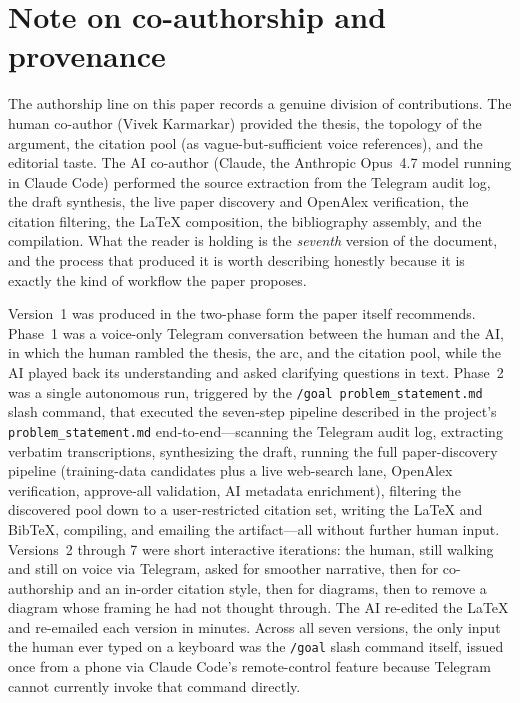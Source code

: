 \documentclass[11pt]{article}
\begin{document}
\section*{Note on co-authorship and provenance}

The authorship line on this paper records a genuine division of contributions. The human co-author (Vivek Karmarkar) provided the thesis, the topology of the argument, the citation pool (as vague-but-sufficient voice references), and the editorial taste. The AI co-author (Claude, the Anthropic Opus~4.7 model running in Claude Code) performed the source extraction from the Telegram audit log, the draft synthesis, the live paper discovery and OpenAlex verification, the citation filtering, the \LaTeX{} composition, the bibliography assembly, and the compilation. What the reader is holding is the \emph{seventh} version of the document, and the process that produced it is worth describing honestly because it is exactly the kind of workflow the paper proposes.

Version~1 was produced in the two-phase form the paper itself recommends. Phase~1 was a voice-only Telegram conversation between the human and the AI, in which the human rambled the thesis, the arc, and the citation pool, while the AI played back its understanding and asked clarifying questions in text. Phase~2 was a single autonomous run, triggered by the \texttt{/goal problem\_statement.md} slash command, that executed the seven-step pipeline described in the project's \texttt{problem\_statement.md} end-to-end---scanning the Telegram audit log, extracting verbatim transcriptions, synthesizing the draft, running the full paper-discovery pipeline (training-data candidates plus a live web-search lane, OpenAlex verification, approve-all validation, AI metadata enrichment), filtering the discovered pool down to a user-restricted citation set, writing the \LaTeX{} and BibTeX, compiling, and emailing the artifact---all without further human input. Versions~2 through 7 were short interactive iterations: the human, still walking and still on voice via Telegram, asked for smoother narrative, then for co-authorship and an in-order citation style, then for diagrams, then to remove a diagram whose framing he had not thought through. The AI re-edited the \LaTeX{} and re-emailed each version in minutes. Across all seven versions, the only input the human ever typed on a keyboard was the \texttt{/goal} slash command itself, issued once from a phone via Claude Code's remote-control feature because Telegram cannot currently invoke that command directly.
\end{document}
